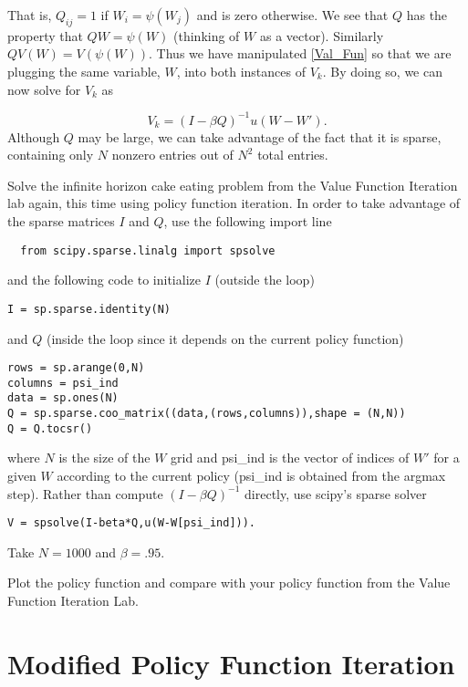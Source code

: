 That is, $Q_{ij} = 1$ if $W_i = \psi(W_j)$ and is zero otherwise.  We see that $Q$ has the property that $QW = \psi(W)$ (thinking of $W$ as a vector).  Similarly $QV(W) = V(\psi(W))$.  Thus we have manipulated \ref{Val_Fun} so that we are plugging the same variable, $W$, into both instances of $V_k$.  By doing so, we can now solve for $V_k$ as

\begin{equation}
V_k = (I-\beta Q)^{-1}u(W-W').
\end{equation}
Although $Q$ may be large, we can take advantage of the fact that it is sparse, containing only $N$ nonzero entries out of $N^2$ total entries.

\begin{problem}
Solve the infinite horizon cake eating problem from the Value Function Iteration lab again, this time using policy function iteration.  In order to take advantage of the sparse matrices $I$ and $Q$, use the following import line

\begin{lstlisting}
  from scipy.sparse.linalg import spsolve
\end{lstlisting}

and the following code to initialize $I$ (outside the loop)
\begin{lstlisting}
I = sp.sparse.identity(N)
\end{lstlisting}
and $Q$ (inside the loop since it depends on the current policy function)
\begin{lstlisting}
rows = sp.arange(0,N)
columns = psi_ind
data = sp.ones(N)
Q = sp.sparse.coo_matrix((data,(rows,columns)),shape = (N,N))
Q = Q.tocsr()
\end{lstlisting}
where $N$ is the size of the $W$ grid and psi\_ind is the vector of indices of $W'$ for a given $W$ according to the current policy (psi\_ind is obtained from the argmax step).  Rather than compute $(I-\beta Q)^{-1}$ directly, use scipy's sparse solver

\begin{lstlisting}
V = spsolve(I-beta*Q,u(W-W[psi_ind])).
\end{lstlisting}



Take $N = 1000$ and $\beta = .95$.

Plot the policy function and compare with your policy function from the Value Function Iteration Lab.
\end{problem}

\section*{Modified Policy Function Iteration}

